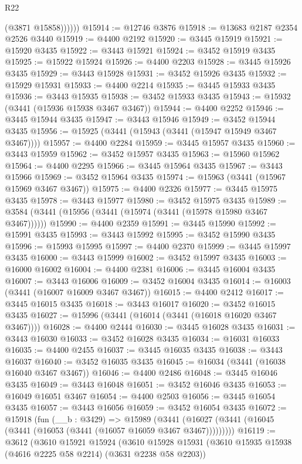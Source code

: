 \begin{lexlean}{R22}
\begin{coremodule}
              (@3871 @15858))))))
@15914 := @12746 @3876
@15918 := @13683 @2187 @2354 @2526 @3440
@15919 := @4400 @2192
@15920 := @3445 @15919
@15921 := @15920 @3435
@15922 := @3443 @15921
@15924 := @3452 @15919 @3435
@15925 := @15922 @15924
@15926 := @4400 @2203
@15928 := @3445 @15926 @3435
@15929 := @3443 @15928
@15931 := @3452 @15926 @3435
@15932 := @15929 @15931
@15933 := @4400 @2214
@15935 := @3445 @15933 @3435
@15936 := @3443 @15935
@15938 := @3452 @15933 @3435
@15943 := @15932 (@3441 (@15936 @15938 @3467 @3467))
@15944 := @4400 @2252
@15946 := @3445 @15944 @3435
@15947 := @3443 @15946
@15949 := @3452 @15944 @3435
@15956 := @15925 (@3441 (@15943 (@3441 (@15947 @15949 @3467 @3467))))
@15957 := @4400 @2284
@15959 := @3445 @15957 @3435
@15960 := @3443 @15959
@15962 := @3452 @15957 @3435
@15963 := @15960 @15962
@15964 := @4400 @2295
@15966 := @3445 @15964 @3435
@15967 := @3443 @15966
@15969 := @3452 @15964 @3435
@15974 := @15963 (@3441 (@15967 @15969 @3467 @3467))
@15975 := @4400 @2326
@15977 := @3445 @15975 @3435
@15978 := @3443 @15977
@15980 := @3452 @15975 @3435
@15989 := @3584 (@3441 (@15956 (@3441 (@15974 (@3441 (@15978 @15980 @3467 @3467))))))
@15990 := @4400 @2359
@15991 := @3445 @15990
@15992 := @15991 @3435
@15993 := @3443 @15992
@15995 := @3452 @15990 @3435
@15996 := @15993 @15995
@15997 := @4400 @2370
@15999 := @3445 @15997 @3435
@16000 := @3443 @15999
@16002 := @3452 @15997 @3435
@16003 := @16000 @16002
@16004 := @4400 @2381
@16006 := @3445 @16004 @3435
@16007 := @3443 @16006
@16009 := @3452 @16004 @3435
@16014 := @16003 (@3441 (@16007 @16009 @3467 @3467))
@16015 := @4400 @2412
@16017 := @3445 @16015 @3435
@16018 := @3443 @16017
@16020 := @3452 @16015 @3435
@16027 := @15996 (@3441 (@16014 (@3441 (@16018 @16020 @3467 @3467))))
@16028 := @4400 @2444
@16030 := @3445 @16028 @3435
@16031 := @3443 @16030
@16033 := @3452 @16028 @3435
@16034 := @16031 @16033
@16035 := @4400 @2455
@16037 := @3445 @16035 @3435
@16038 := @3443 @16037
@16040 := @3452 @16035 @3435
@16045 := @16034 (@3441 (@16038 @16040 @3467 @3467))
@16046 := @4400 @2486
@16048 := @3445 @16046 @3435
@16049 := @3443 @16048
@16051 := @3452 @16046 @3435
@16053 := @16049 @16051 @3467
@16054 := @4400 @2503
@16056 := @3445 @16054 @3435
@16057 := @3443 @16056
@16059 := @3452 @16054 @3435
@16072 := @15918
    (fun (__b : @3429) =>
    @15989 (@3441 (@16027 (@3441 (@16045 (@3441 (@16053 (@3441 (@16057 @16059 @3467 @3467)))))))))
@16119 := @3612
    (@3610
      @15921
      @15924
      (@3610
        @15928
        @15931
        (@3610 @15935 @15938 (@4616 @2225 @58 @2214) (@3631 @2238 @58 @2203))

\end{coremodule}
\end{lexlean}
